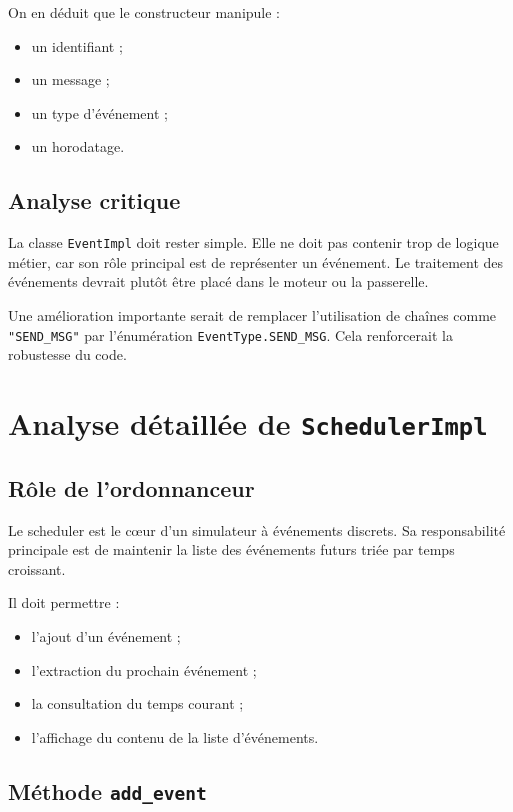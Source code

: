 \documentclass{article}
\begin{document}
On en déduit que le constructeur manipule :
\begin{itemize}[leftmargin=*]
    \item un identifiant ;
    \item un message ;
    \item un type d’événement ;
    \item un horodatage.
\end{itemize}

\subsection{Analyse critique}

La classe \texttt{EventImpl} doit rester simple. Elle ne doit pas contenir trop de logique métier, car son rôle principal est de représenter un événement. Le traitement des événements devrait plutôt être placé dans le moteur ou la passerelle.

Une amélioration importante serait de remplacer l’utilisation de chaînes comme \texttt{"SEND\_MSG"} par l’énumération \texttt{EventType.SEND\_MSG}. Cela renforcerait la robustesse du code.

\section{Analyse détaillée de \texttt{SchedulerImpl}}

\subsection{Rôle de l’ordonnanceur}

Le scheduler est le cœur d’un simulateur à événements discrets. Sa responsabilité principale est de maintenir la liste des événements futurs triée par temps croissant.

Il doit permettre :
\begin{itemize}[leftmargin=*]
    \item l’ajout d’un événement ;
    \item l’extraction du prochain événement ;
    \item la consultation du temps courant ;
    \item l’affichage du contenu de la liste d’événements.
\end{itemize}

\subsection{Méthode \texttt{add\_event}}
\end{document}
